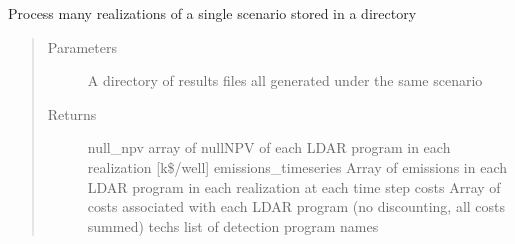 \documentclass[letterpaper,10pt,english]{sphinxmanual}
\begin{document}
\begin{fulllineitems}
\label{\detokenize{index:feast.ResultsProcessing.results_analysis_functions.results_analysis}}
Process many realizations of a single scenario stored in a directory
\begin{quote}\begin{description}
\item[{Parameters}] \leavevmode
{} \textendash{} A directory of results files all generated under the same scenario

\item[{Returns}] \leavevmode
null\_npv          array of null\sphinxhyphen{}NPV of each LDAR program in each realization {[}k\$/well{]}
emissions\_timeseries  Array of emissions in each LDAR program in each realization at each time step
costs                 Array of costs associated with each LDAR program (no discounting, all costs summed)
techs           list of detection program names

\end{description}\end{quote}

\end{fulllineitems}
\end{document}
